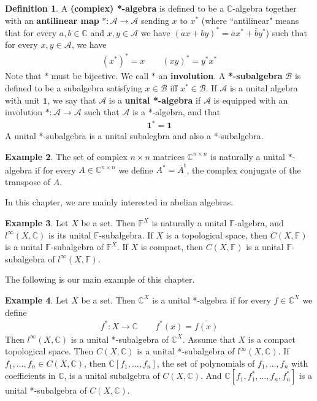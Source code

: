 \documentclass[12pt,b5paper,notitlepage]{article}
\theoremstyle{definition}
\newtheorem{df}{Definition}[section]
\newtheorem{eg}[df]{Example}
\theoremstyle{plain}
\newcommand{\ovl}{\overline}
\newcommand{\tr}{\mathrm{t}} %
\newcommand{\idt}{\mathbf{1}}
\newcommand{\scr}{\mathscr}
\newcommand{\Cbb}{\mathbb C}
\newcommand{\Fbb}{\mathbb F}
\numberwithin{equation}{section}
\begin{document}
\begin{df}
A \textbf{(complex) *-algebra}  is defined to be a $\Cbb$-algebra together with an \textbf{antilinear map}  $*:\scr A\rightarrow\scr A$ sending $x$ to $x^*$ (where ``antilinear" means that for every $a,b\in\Cbb$ and $x,y\in\scr A$ we have $(ax+by)^*=\ovl ax^*+\ovl by^*$) such that for every $x,y\in\scr A$, we have
\begin{align*}
(x^*)^*=x\qquad (xy)^*=y^*x^*
\end{align*}
Note that $*$ must be bijective. We call $*$ an \textbf{involution}. 
 A \textbf{*-subalgebra}  $\scr B$ is defined to be a subalgebra satisfying $x\in\scr B$ iff $x^*\in\scr B$. If $\scr A$ is a unital algebra with unit $\idt$, we say that $\scr A$ is a \textbf{unital *-algebra} if $\scr A$ is equipped with an involution $*:\scr A\rightarrow\scr A$ such that $\scr A$ is a *-algebra, and that
\begin{align*}
\idt^*=\idt
\end{align*}
A unital *-subalgebra is a unital subalegbra and also a *-subalgebra.
\end{df}


\begin{eg}
The set of complex $n\times n$ matrices $\Cbb^{n\times n}$ is naturally a unital $*$-algebra if for every $A\in\Cbb^{n\times n}$ we define $A^*=\ovl A^\tr$, the complex conjugate of the transpose of $A$.
\end{eg}

In this chapter, we are mainly interested in abelian algebras.

\begin{eg}
Let $X$ be a set. Then $\Fbb^X$ is naturally a unital $\Fbb$-algebra, and $l^\infty(X,\Cbb)$ is its unital $\Fbb$-subalgebra. If $X$ is a topological space, then $C(X,\Fbb)$ is a unital $\Fbb$-subalgebra of $\Fbb^X$. If $X$ is compact, then $C(X,\Fbb)$ is a unital $\Fbb$-subalgebra of $l^\infty(X,\Fbb)$.
\end{eg}



The following is our main example of this chapter.
\begin{eg}
Let $X$ be a set. Then $\Cbb^X$ is a unital *-algebra if for every $f\in\Cbb^X$ we define \index{f@$f^*(x)=\ovl{f(x)}$}
\begin{align}
f^*:X\rightarrow\Cbb\qquad f^*(x)=\ovl{f(x)}
\end{align}
Then $l^\infty(X,\Cbb)$ is a unital *-subalgebra of $\Cbb^X$. Assume that $X$ is a compact topological space. Then $C(X,\Cbb)$ is a unital *-subalgebra of $l^\infty(X,\Cbb)$. If $f_1,\dots,f_n\in C(X,\Cbb)$, then $\Cbb[f_1,\dots,f_n]$, the set of polynomials of $f_1,\dots,f_n$ with coefficients in $\Cbb$, is a unital subalgebra of $C(X,\Cbb)$. And $\Cbb[f_1,f_1^*,\dots,f_n,f_n^*]$ is a unital *-subalgebra of $C(X,\Cbb)$.
\end{eg}
\end{document}
